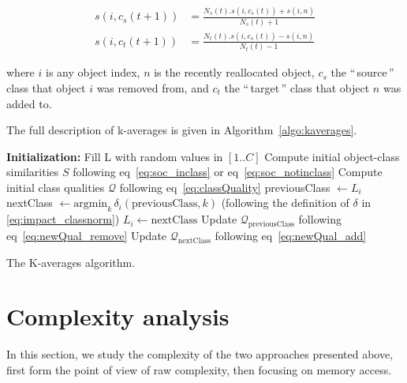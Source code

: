 \documentclass[twoside,11pt]{article}
\newcommand{\gl}[1]{``\,#1\,''} %
\begin{document}
\begin{equation}
	\begin{aligned}
    s(i, c_s(t+1)) &= \frac{N_s(t).s(i, c_s(t)) + s(i,n)}{N_s(t)+1} \\
    s(i, c_t(t+1)) &= \frac{N_t(t).s(i, c_s(t)) - s(i,n)}{N_t(t)-1}
   	\end{aligned}
  \label{eq:newSimilNewC}
\end{equation}

\noindent where $i$ is any object index, $n$ is the recently reallocated object, $c_s$ the \gl{source} class that object $i$ was removed from, and $c_t$ the \gl{target} class that object $n$ was added to.

The full description of k-averages is given in Algorithm~\ref{algo:kaverages}.

\begin{algorithm}
	\label{algo:kaverages}
	\SetAlgoLined
	\BlankLine	
	\textbf{Initialization:}
		Fill L with random values in $[1..C]$\;
		Compute initial object-class similarities $S$ following eq~\ref{eq:soc_inclass} or eq~\ref{eq:soc_notinclass}\;
		Compute initial class qualities $\mathcal{Q}$ following eq~\ref{eq:classQuality}\;
	\BlankLine	
	 {
		 {
			previousClass $\leftarrow L_i$\;
			nextClass $\leftarrow \mathrm{argmin}_k\,\delta_i(\mathrm{previousClass}, k)$ \label{algline:kaverages_search}
			(following the definition of $\delta$ in  \ref{eq:impact_classnorm})\; %
			 {
				$L_i \leftarrow \mathrm{nextClass}$\;
				Update $\mathcal{Q}_\mathrm{previousClass}$ following eq~\ref{eq:newQual_remove}\;
				Update $\mathcal{Q}_\mathrm{nextClass}$ following eq~\ref{eq:newQual_add}\;
			}
		}
	}
	\BlankLine
	\caption{The K-averages algorithm.}
\end{algorithm}


\section{Complexity analysis}
\label{sec:complexity}

In this section, we study the complexity of the two approaches presented above, first form the point of view of raw complexity, then focusing on memory access.
\end{document}
